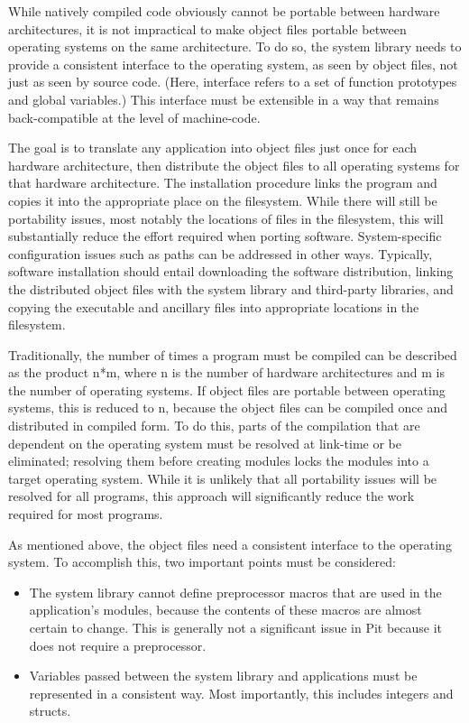 While natively compiled code obviously cannot be portable between hardware architectures, it is not impractical to make object
files portable between operating systems on the same architecture.  To do so, the system library needs to provide a
consistent interface to the operating system, as seen by object files, not just as seen by source code.  (Here,
interface refers to a set of function prototypes and global variables.)  This interface must be extensible in a way that
remains back-compatible at the level of machine-code.

The goal is to translate any application into object files just once for each hardware architecture, then distribute
the object files to all operating systems for that hardware architecture.  The installation procedure links the program
and copies it into the appropriate place on the filesystem.  While there will still be portability issues, most notably
the locations of files in the filesystem, this will substantially reduce the effort required when porting software.
System-specific configuration issues such as paths can be addressed in other ways.  Typically, software installation
should entail downloading the software distribution, linking the distributed object files with the system library and
third-party libraries, and copying the executable and ancillary files into appropriate locations in the filesystem.

Traditionally, the number of times a program must be compiled can be described as the product n*m, where n is the number of
hardware architectures and m is the number of operating systems.  If object files are portable between operating systems, this is reduced to n,
because the object files can be compiled once and distributed in compiled form.  To do this, parts of the compilation
that are dependent on the operating system must be resolved at link-time or be eliminated; resolving them before
creating modules locks the modules into a target operating system.  While it is unlikely that all portability issues
will be resolved for all programs, this approach will significantly reduce the work required
for most programs.

As mentioned above, the object files need a consistent interface to the operating system.  To accomplish this, two important
points must be considered:

\begin{itemize}
\item
	The system library cannot define preprocessor macros that are used in the application's modules, because the contents of
	these macros are almost certain to change.  This is generally not a significant issue in Pit because it does not
	require a preprocessor.
\item
	Variables passed between the system library and applications must be represented in a consistent way.  Most
	importantly, this includes integers and structs.
\end{itemize}

